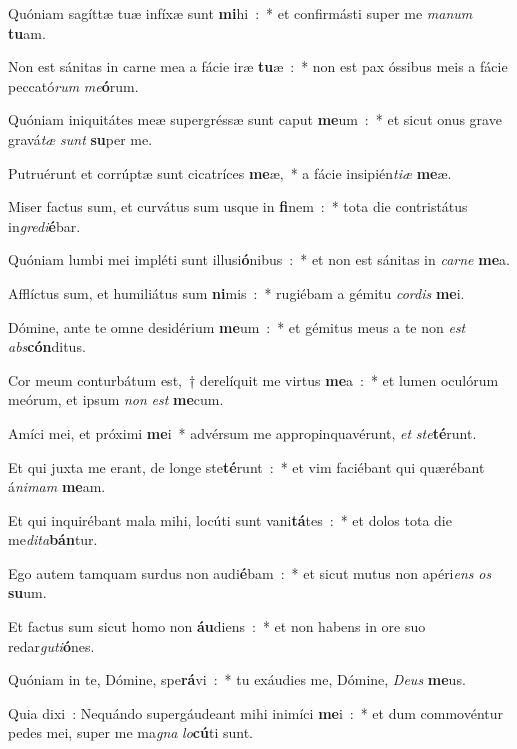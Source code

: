 ﻿\item Quóniam sagíttæ tuæ infíxæ sunt \textbf{mi}hi~:~* et confirmásti super me \emph{ma}\emph{num} \textbf{tu}am.
\item Non est sánitas in carne mea a fácie iræ \textbf{tu}æ~:~* non est pax óssibus meis a fácie peccató\emph{rum} \emph{me}\textbf{ó}rum.
\item Quóniam iniquitátes meæ supergréssæ sunt caput \textbf{me}um~:~* et sicut onus grave gravá\emph{tæ} \emph{sunt} \textbf{su}per me.
\item Putruérunt et corrúptæ sunt cicatríces \textbf{me}æ,~* a fácie insipién\emph{ti}\emph{æ} \textbf{me}æ.
\item Miser factus sum, et curvátus sum usque in \textbf{fi}nem~:~* tota die contristátus in\emph{gre}\emph{di}\textbf{é}bar.
\item Quóniam lumbi mei impléti sunt illusi\textbf{ó}nibus~:~* et non est sánitas in \emph{car}\emph{ne} \textbf{me}a.
\item Afflíctus sum, et humiliátus sum \textbf{ni}mis~:~* rugiébam a gémitu \emph{cor}\emph{dis} \textbf{me}i.
\item Dómine, ante te omne desidérium \textbf{me}um~:~* et gémitus meus a te non \emph{est} \emph{abs}\textbf{cón}ditus.
\item Cor meum conturbátum est,~† derelíquit me virtus \textbf{me}a~:~* et lumen oculórum meórum, et ipsum \emph{non} \emph{est} \textbf{me}cum.
\item Amíci mei, et próximi \textbf{me}i~* advérsum me appropinquavérunt, \emph{et} \emph{ste}\textbf{té}runt.
\item Et qui juxta me erant, de longe ste\textbf{té}runt~:~* et vim faciébant qui quærébant á\emph{ni}\emph{mam} \textbf{me}am.
\item Et qui inquirébant mala mihi, locúti sunt vani\textbf{tá}tes~:~* et dolos tota die me\emph{di}\emph{ta}\textbf{bán}tur.
\item Ego autem tamquam surdus non audi\textbf{é}bam~:~* et sicut mutus non apéri\emph{ens} \emph{os} \textbf{su}um.
\item Et factus sum sicut homo non \textbf{áu}diens~:~* et non habens in ore suo redar\emph{gu}\emph{ti}\textbf{ó}nes.
\item Quóniam in te, Dómine, spe\textbf{rá}vi~:~* tu exáudies me, Dómine, \emph{De}\emph{us} \textbf{me}us.
\item Quia dixi~: Nequándo supergáudeant mihi inimíci \textbf{me}i~:~* et dum commovéntur pedes mei, super me ma\emph{gna} \emph{lo}\textbf{cú}ti sunt.
